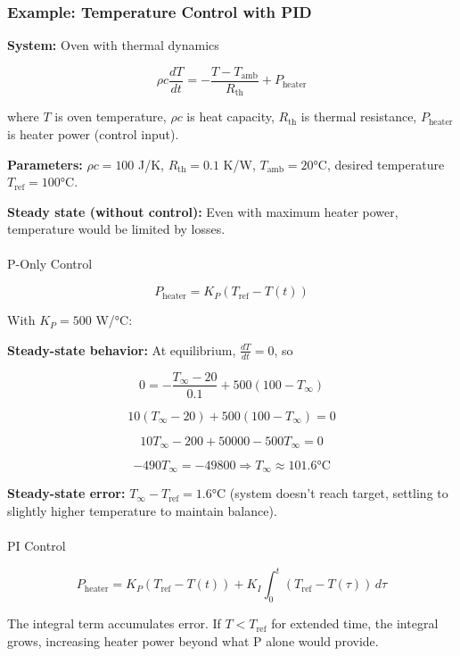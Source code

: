 \documentclass[
]{article}
\makeatletter
\let\oldparagraph\paragraph
\renewcommand{\paragraph}{
    \@ifstar
      \xxxParagraphStar
      \xxxParagraphNoStar
  }
\newcommand{\xxxParagraphStar}[1]{\oldparagraph*{#1}\mbox{}}
\newcommand{\xxxParagraphNoStar}[1]{\oldparagraph{#1}\mbox{}}
\makeatother
\begin{document}
\subsubsection{Example: Temperature Control with
PID}\label{example-temperature-control-with-pid}

\textbf{System:} Oven with thermal dynamics

\[\rho c \frac{dT}{dt} = -\frac{T - T_{\text{amb}}}{R_{\text{th}}} + P_{\text{heater}}\]

where \(T\) is oven temperature, \(\rho c\) is heat capacity,
\(R_{\text{th}}\) is thermal resistance, \(P_{\text{heater}}\) is heater
power (control input).

\textbf{Parameters:} \(\rho c = 100\) J/K, \(R_{\text{th}} = 0.1\) K/W,
\(T_{\text{amb}} = 20°\)C, desired temperature
\(T_{\text{ref}} = 100°\)C.

\textbf{Steady state (without control):} Even with maximum heater power,
temperature would be limited by losses.

\paragraph{P-Only Control}\label{p-only-control}

\[P_{\text{heater}} = K_P (T_{\text{ref}} - T(t))\]

With \(K_P = 500\) W/°C:

\textbf{Steady-state behavior:} At equilibrium, \(\frac{dT}{dt} = 0\),
so

\[0 = -\frac{T_{\infty} - 20}{0.1} + 500(100 - T_{\infty})\]

\[10(T_{\infty} - 20) + 500(100 - T_{\infty}) = 0\]

\[10T_{\infty} - 200 + 50000 - 500T_{\infty} = 0\]

\[-490T_{\infty} = -49800 \Rightarrow T_{\infty} \approx 101.6°\text{C}\]

\textbf{Steady-state error:} \(T_{\infty} - T_{\text{ref}} = 1.6°\)C
(system doesn't reach target, settling to slightly higher temperature to
maintain balance).

\paragraph{PI Control}\label{pi-control}

\[P_{\text{heater}} = K_P (T_{\text{ref}} - T(t)) + K_I \int_0^t (T_{\text{ref}} - T(\tau))\,d\tau\]

The integral term accumulates error. If \(T < T_{\text{ref}}\) for
extended time, the integral grows, increasing heater power beyond what P
alone would provide.
\end{document}
